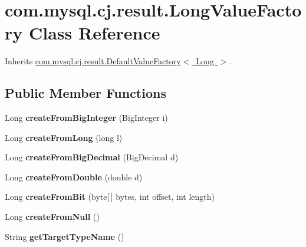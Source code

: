 \hypertarget{classcom_1_1mysql_1_1cj_1_1result_1_1_long_value_factory}{}\section{com.\+mysql.\+cj.\+result.\+Long\+Value\+Factory Class Reference}
\label{classcom_1_1mysql_1_1cj_1_1result_1_1_long_value_factory}


Inherits \mbox{\hyperlink{classcom_1_1mysql_1_1cj_1_1result_1_1_default_value_factory}{com.\+mysql.\+cj.\+result.\+Default\+Value\+Factory$<$ Long $>$}}.

\subsection*{Public Member Functions}
\begin{DoxyCompactItemize}
\item 
\mbox{\label{classcom_1_1mysql_1_1cj_1_1result_1_1_long_value_factory_a7ac17adb9b724b44b8f1e95a0c30d4c4}} 
Long {\bfseries create\+From\+Big\+Integer} (Big\+Integer i)
\item 
\mbox{\label{classcom_1_1mysql_1_1cj_1_1result_1_1_long_value_factory_aff06579b35fd467368cf4ec792fbee5c}} 
Long {\bfseries create\+From\+Long} (long l)
\item 
\mbox{\label{classcom_1_1mysql_1_1cj_1_1result_1_1_long_value_factory_afce07f3792b738f044e6e7769ec4ebc7}} 
Long {\bfseries create\+From\+Big\+Decimal} (Big\+Decimal d)
\item 
\mbox{\label{classcom_1_1mysql_1_1cj_1_1result_1_1_long_value_factory_a517b1b127dfdb6bce9ddd4a139cfde8b}} 
Long {\bfseries create\+From\+Double} (double d)
\item 
\mbox{\label{classcom_1_1mysql_1_1cj_1_1result_1_1_long_value_factory_a3d798a5f5ef704f76a58ba154ef1be35}} 
Long {\bfseries create\+From\+Bit} (byte\mbox{[}$\,$\mbox{]} bytes, int offset, int length)
\item 
\mbox{\label{classcom_1_1mysql_1_1cj_1_1result_1_1_long_value_factory_a77abe2bb6797a666c97ecc9a9a582ec0}} 
Long {\bfseries create\+From\+Null} ()
\item 
\mbox{\label{classcom_1_1mysql_1_1cj_1_1result_1_1_long_value_factory_ae2d18f108811fd6b2fb59aff9d931689}} 
String {\bfseries get\+Target\+Type\+Name} ()
\end{DoxyCompactItemize}


